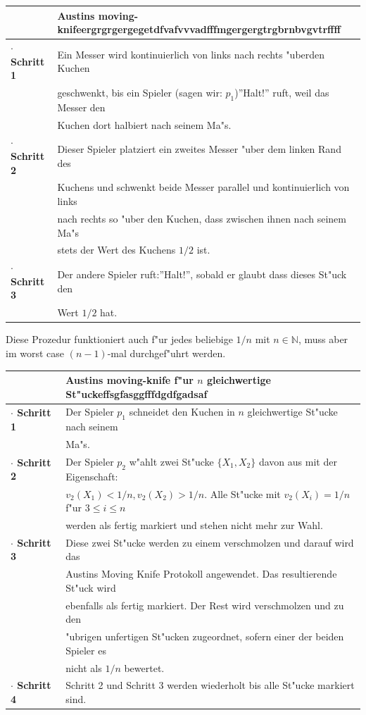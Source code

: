 \documentclass[11pt, a4paper, twoside]{article}
\newcommand{\wf}{\color{white}}
\newcommand{\tf}{\color{black}}
\numberwithin{equation}{section}
\begin{document}
\begin{tabular}{|ll|}
\hline
&\textbf{Austins moving-knife}\wf ergrgrgergegetdfvafvvvadfffmgergergtrgbrnbvgvtrffff\tf\\
\hline
\textbf{$\cdot$ Schritt 1}& Ein Messer wird kontinuierlich von links nach rechts "uberden Kuchen\\&geschwenkt, bis ein Spieler (sagen wir: $p_1$)''Halt!'' ruft, weil das Messer den\\&Kuchen dort halbiert nach seinem Ma"s.\\
\textbf{$\cdot$ Schritt 2}& Dieser Spieler platziert ein zweites Messer "uber dem linken Rand des\\&Kuchens und schwenkt beide Messer parallel und kontinuierlich von links\\&nach rechts so "uber den Kuchen, dass zwischen ihnen nach seinem Ma"s\\&stets der Wert des Kuchens $1/2$ ist.\\
\textbf{$\cdot$ Schritt 3}& Der andere Spieler ruft:''Halt!'', sobald er glaubt dass dieses St"uck den\\&Wert $1/2$ hat.\\
\hline
\end{tabular}
\newline
\newline
\newline
Diese Prozedur funktioniert auch f"ur jedes beliebige $1/n$ mit $n \in \mathbb{N}$, muss aber im worst case $(n-1)$-mal durchgef"uhrt werden.\\
\newline
\begin{tabular}{|ll|}
\hline
&\textbf{Austins moving-knife f"ur $n$ gleichwertige St"ucke}\wf ffsgfasggfffdgdfgadsaf\tf\\
\hline
\textbf{$\cdot$ Schritt 1}& Der Spieler $p_1$ schneidet den Kuchen in $n$ gleichwertige St"ucke nach seinem\\&Ma"s.\\
\textbf{$\cdot$ Schritt 2}& Der Spieler $p_2$ w"ahlt zwei St"ucke $\{X_1,X_2\}$ davon aus mit der Eigenschaft:\\&$v_2(X_1) < 1/n,v_2(X_2) > 1/n$. Alle St"ucke mit $v_2(X_i)=1/n$ f"ur $3\leq i \leq n$\\&werden als fertig markiert und stehen nicht mehr zur Wahl.\\
\textbf{$\cdot$ Schritt 3}& Diese zwei St"ucke werden zu einem verschmolzen und darauf wird das\\&Austins Moving Knife Protokoll angewendet. Das resultierende St"uck wird\\&ebenfalls als fertig markiert. Der Rest wird verschmolzen und zu den\\&"ubrigen unfertigen St"ucken zugeordnet, sofern einer der beiden Spieler es\\&nicht als $1/n$ bewertet.\\
\textbf{$\cdot$ Schritt 4}& Schritt 2 und Schritt 3 werden wiederholt bis alle St"ucke markiert sind.\\
\hline
\end{tabular}
\end{document}
